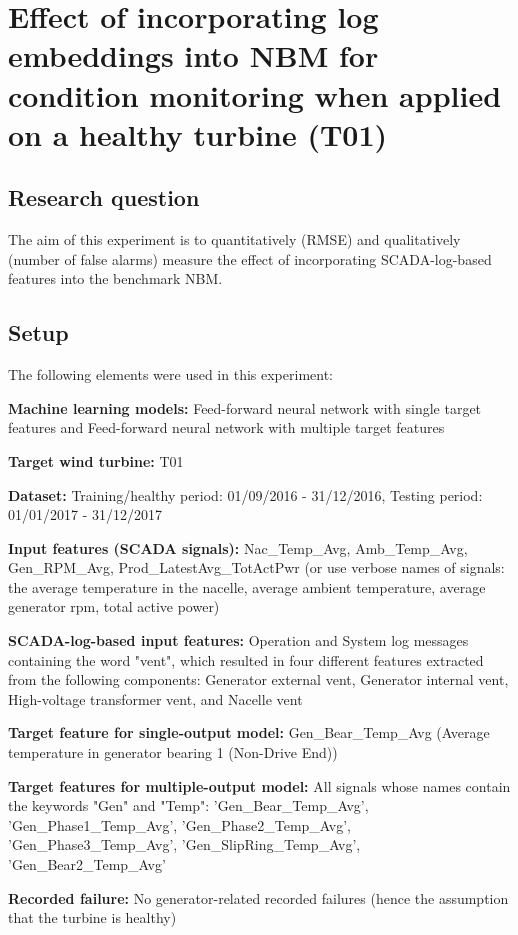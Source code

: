 \section{Effect of incorporating log embeddings into NBM for condition monitoring when applied on a healthy turbine (T01)}

\subsection{Research question}
The aim of this experiment is to quantitatively (RMSE) and qualitatively (number of false alarms) measure the effect of incorporating SCADA-log-based features into the benchmark NBM.

\subsection{Setup}
The following elements were used in this experiment:
\begin{bulletList}
    \item \textbf{Machine learning models:} Feed-forward neural network with single target features and Feed-forward neural network with multiple target features
    \item \textbf{Target wind turbine:} T01
    \item \textbf{Dataset:} Training/healthy period: 01/09/2016 - 31/12/2016, Testing period: 01/01/2017 - 31/12/2017
    \item \textbf{Input features (SCADA signals):} Nac\_Temp\_Avg, Amb\_Temp\_Avg, Gen\_RPM\_Avg, Prod\_LatestAvg\_TotActPwr (or use verbose names of signals: the average temperature in the nacelle, average ambient temperature, average generator rpm, total active power)
    \item \textbf{SCADA-log-based input features:} Operation and System log messages containing the word "vent", which resulted in four different features extracted from the following components: Generator external vent, Generator internal vent, High-voltage transformer vent, and Nacelle vent
    \item \textbf{Target feature for single-output model: } Gen\_Bear\_Temp\_Avg (Average temperature in generator bearing 1 (Non-Drive End))
    \item \textbf{Target features for multiple-output model:} All signals whose names contain the keywords "Gen" and "Temp": 'Gen\_Bear\_Temp\_Avg', 'Gen\_Phase1\_Temp\_Avg', 'Gen\_Phase2\_Temp\_Avg', 'Gen\_Phase3\_Temp\_Avg', 'Gen\_SlipRing\_Temp\_Avg', 'Gen\_Bear2\_Temp\_Avg'
    \item \textbf{Recorded failure:} No generator-related recorded failures (hence the assumption that the turbine is healthy)
\end{bulletList}

